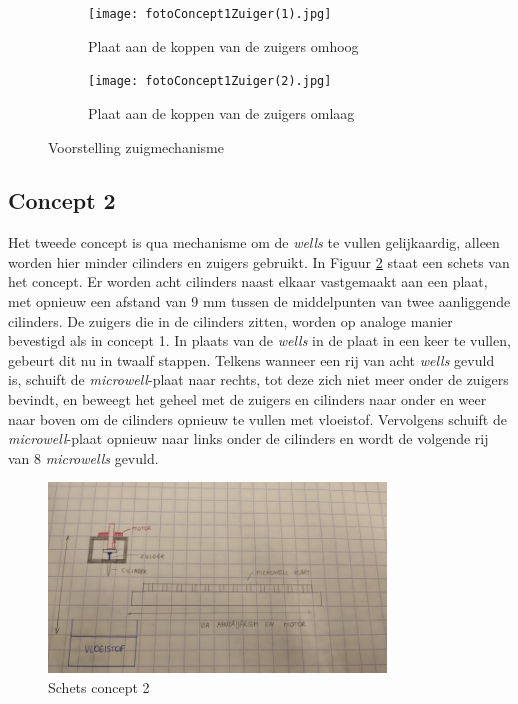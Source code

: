 \documentclass[a4paper,twoside,kulak]{kulakreport} %
\begin{document}
\begin{figure}
	\centering
	\begin{subfigure}{.5\textwidth}
		\centering
		\texttt{[image: fotoConcept1Zuiger(1).jpg]}
		\caption{Plaat aan de koppen van de zuigers omhoog}
	\end{subfigure}%
	\begin{subfigure}{.5\textwidth}
		\centering
		\texttt{[image: fotoConcept1Zuiger(2).jpg]}
		\caption{Plaat aan de koppen van de zuigers omlaag}
	\end{subfigure}
	\caption{Voorstelling zuigmechanisme}
	\label{fig:foto concept 1 zuiger}
\end{figure}

\subsection{Concept 2}
Het tweede concept is qua mechanisme om de \textit{wells} te vullen gelijkaardig, alleen worden hier minder cilinders en zuigers gebruikt. In Figuur \ref{fig: schets concept 2} staat een schets van het concept. Er worden acht cilinders naast elkaar vastgemaakt aan een plaat, met opnieuw een afstand van 9 mm tussen de middelpunten van twee aanliggende cilinders. De zuigers die in de cilinders zitten, worden op analoge manier bevestigd als in concept 1. In plaats van de \textit{wells} in de plaat in een keer te vullen, gebeurt dit nu in twaalf stappen. Telkens wanneer een rij van acht \textit{wells} gevuld is, schuift de \textit{microwell}-plaat naar rechts, tot deze zich niet meer onder de zuigers bevindt, en beweegt het geheel met de zuigers en cilinders naar onder en weer naar boven om de cilinders opnieuw te vullen met vloeistof. Vervolgens schuift de \textit{microwell}-plaat opnieuw naar links onder de cilinders en wordt de volgende rij van 8 \textit{microwells} gevuld.

\begin{figure}[h]
	\centering
	\includegraphics[width=0.8\textwidth]{fotoConcept2.jpg}
	\caption{Schets concept 2}
	\label{fig: schets concept 2}
	
\end{figure} 
\end{document}
